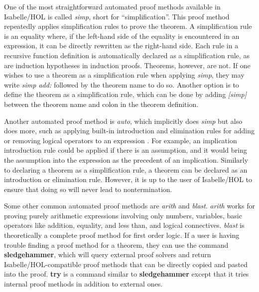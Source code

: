 \documentclass{article}
\begin{document}
One of the most straightforward automated proof methods available in 
Isabelle/HOL is called \textit{simp}, short for ``simplification''. This proof 
method repeatedly applies simplification rules to prove the theorem. A 
simplification rule is an equality where, if the left-hand side of the equality 
is encountered in an expression, it can be directly rewritten as the right-hand 
side. Each rule in a recursive function definition is automatically declared as 
a simplification rule, as are induction hypotheses in induction proofs. 
Theorems, however, are not. If one wishes to use a theorem as a simplification 
rule when applying \textit{simp}, they may write \textit{simp add:} followed by 
the theorem name to do so. Another option is to define the theorem as a 
simplification rule, which can be done by adding \textit{[simp]} between the 
theorem name and colon in the theorem definition.

Another automated proof method is \textit{auto}, which implicitly does
\textit{simp} but also does more, such as applying built-in introduction and 
elimination rules for adding or removing logical operators to an expression 
\cite{IsabelleManual}. 
For example, an implication introduction rule could be applied if there is an 
assumption, and it would bring the assumption into the expression as the 
precedent of an implication. Similarly to declaring a theorem as a 
simplification rule, a theorem can be declared as an introduction or 
elimination rule. However, it is up to the user of Isabelle/HOL to ensure that 
doing so will never lead to nontermination.

Some other common automated proof methods are \textit{arith} and 
\textit{blast}. \textit{arith} works for proving purely arithmetic expressions 
involving only numbers, variables, basic operators like addition, equality, and 
less than, and logical connectives. \textit{blast} is theoretically a complete 
proof method for first order logic. If a user is having trouble finding a proof 
method for a theorem, they can use the command \textbf{sledgehammer}, which 
will query external proof solvers and return Isabelle/HOL-compatible proof 
methods that can be directly copied and pasted into the proof. \textbf{try} is 
a command similar to \textbf{sledgehammer} except that it tries internal proof 
methods in addition to external ones.

\newpage

\nocite{*}




\end{document}
